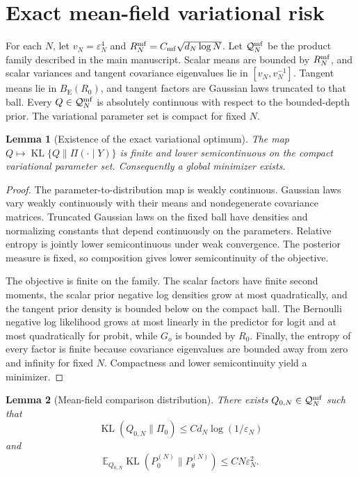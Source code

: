 \documentclass[
  12pt]{article}
\newtheorem{lemma}{Lemma}[section]
\theoremstyle{definition}
\theoremstyle{plain}
\newcommand{\E}{\mathbb E}
\newcommand{\KL}{\operatorname{KL}}
\newcommand{\calQ}{\mathcal Q}
\newcommand{\eps}{\varepsilon}
\begin{document}
\section{Exact mean-field variational risk}

For each $N$, let $v_N=\eps_N^4$ and $R_N^{\rm mf}=C_{\rm mf}\sqrt{d_N\log N}$. Let $\calQ_N^{\rm mf}$ be the product family described in the main manuscript. Scalar means are bounded by $R_N^{\rm mf}$, and scalar variances and tangent covariance eigenvalues lie in $[v_N,v_N^{-1}]$. Tangent means lie in $B_{\mathrm E}(R_0)$, and tangent factors are Gaussian laws truncated to that ball. Every $Q\in\calQ_N^{\rm mf}$ is absolutely continuous with respect to the bounded-depth prior. The variational parameter set is compact for fixed $N$.

\begin{lemma}[Existence of the exact variational optimum]
	\label{supp:vbexist}
	The map $Q\mapsto\KL\{Q\|\Pi(\cdot\mid Y)\}$ is finite and lower semicontinuous on the compact variational parameter set. Consequently a global minimizer exists.
\end{lemma}

\begin{proof}
	The parameter-to-distribution map is weakly continuous. Gaussian laws vary weakly continuously with their means and nondegenerate covariance matrices. Truncated Gaussian laws on the fixed ball have densities and normalizing constants that depend continuously on the parameters. Relative entropy is jointly lower semicontinuous under weak convergence. The posterior measure is fixed, so composition gives lower semicontinuity of the objective.
	
	The objective is finite on the family. The scalar factors have finite second moments, the scalar prior negative log densities grow at most quadratically, and the tangent prior density is bounded below on the compact ball. The Bernoulli negative log likelihood grows at most linearly in the predictor for logit and at most quadratically for probit, while $G_o$ is bounded by $R_0$. Finally, the entropy of every factor is finite because covariance eigenvalues are bounded away from zero and infinity for fixed $N$. Compactness and lower semicontinuity yield a minimizer.
\end{proof}

\begin{lemma}[Mean-field comparison distribution]
	\label{supp:comparison}
	There exists $Q_{0,N}\in\calQ_N^{\rm mf}$ such that
	\[
	\KL(Q_{0,N}\|\Pi_0)\le Cd_N\log(1/\eps_N)
	\]
	and
	\[
	\E_{Q_{0,N}}\KL(P_0^{(N)}\|P_\theta^{(N)})
	\le CN\eps_N^2.
	\]
\end{lemma}
\end{document}
